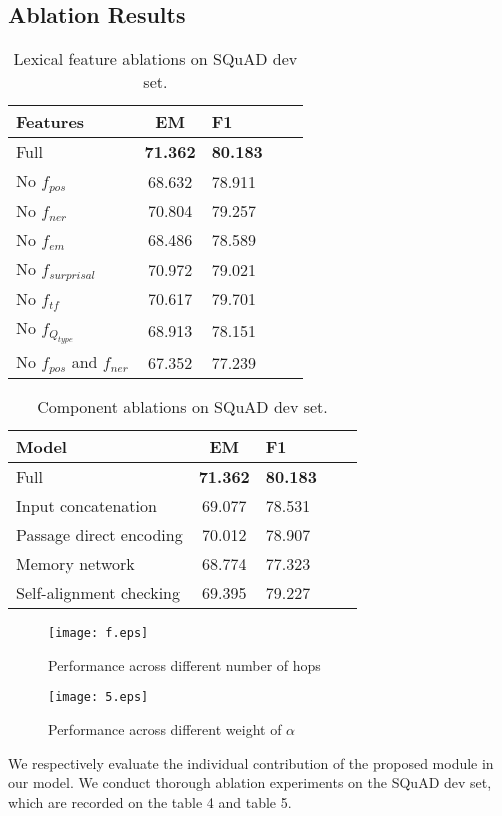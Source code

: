 \documentclass[letterpaper]{article} \usepackage{aaai18}  \usepackage{times}  \usepackage{helvet}  \usepackage{courier}  \usepackage{url}  \usepackage{graphicx}  \usepackage{booktabs}
\begin{document}
\subsection{Ablation Results}
\begin{table}[!t]
	\centering
	\begin{tabular}{lclcl}
		\toprule
		Features & EM &F1 \\
		\midrule
		Full & \textbf{71.362}        &\textbf{80.183}  \\
		\midrule
		No $f_{pos}$ &68.632      &78.911  \\
		No $f_{ner}$ &70.804        &79.257\\
		No $f_{em}$ &68.486       &78.589\\
		No $f_{surprisal}$ &70.972&79.021\\
		No $f_{tf}$ &70.617           &79.701\\
		No $f_{Q_{type}}$ &68.913&78.151\\
		No $f_{pos}$ and $ f_{ner}$ &67.352&77.239\\
		\bottomrule	
	\end{tabular}
	\caption{Lexical feature ablations on SQuAD dev set.}
\end{table}
\begin{table}[!t]
	\centering
	\begin{tabular}{lclcl}
		\toprule
		Model & EM &F1 \\
		\midrule
		Full & \textbf{71.362}        &\textbf{80.183}  \\
		\midrule
		Input concatenation &69.077  &78.531  \\
		Passage direct encoding &70.012&78.907 \\
		Memory network &68.774&77.323\\
		Self-alignment checking&69.395& 79.227 \\
		\bottomrule	
	\end{tabular}
	\caption{Component ablations on SQuAD dev set.}
\end{table}
\begin{figure}[t]
	\centering
	\texttt{[image: f.eps]}
	\caption{Performance across different number of hops}
\end{figure}
\begin{figure}[t]
	\centering
	\texttt{[image: 5.eps]}
	\caption{Performance across different weight of $\alpha$}
\end{figure}
We respectively evaluate the individual contribution of the proposed module in our model. We conduct thorough ablation experiments on the SQuAD dev set, which are recorded on the table 4 and table 5. 
\end{document}
